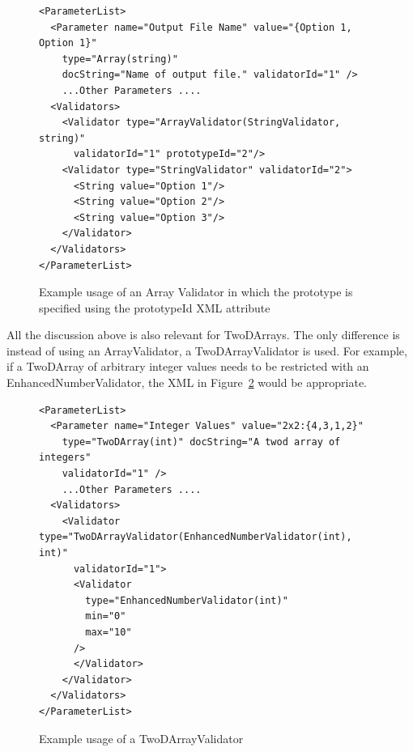 \begin{figure}
\centering
{\footnotesize
\begin{Verbatim}
<ParameterList>
  <Parameter name="Output File Name" value="{Option 1, Option 1}" 
    type="Array(string)" 
    docString="Name of output file." validatorId="1" />
    ...Other Parameters ....
  <Validators>
    <Validator type="ArrayValidator(StringValidator, string)" 
      validatorId="1" prototypeId="2"/>
    <Validator type="StringValidator" validatorId="2">
      <String value="Option 1"/>
      <String value="Option 2"/>
      <String value="Option 3"/>
    </Validator>
  </Validators>
</ParameterList>
\end{Verbatim}
}
\caption{Example usage of an Array Validator in which the prototype is specified using the prototypeId XML attribute}
\label{protoAttributeArrayXML}
\end{figure}

All the discussion above is also relevant for TwoDArrays. The only difference is instead of using an ArrayValidator, a TwoDArrayValidator is used. For
example, if a TwoDArray of arbitrary integer values needs to be restricted with an EnhancedNumberValidator, the XML in Figure~\ref{TwoDArrayValidator}
would be appropriate.
\begin{figure}
\centering
{\footnotesize
\begin{Verbatim}
<ParameterList>
  <Parameter name="Integer Values" value="2x2:{4,3,1,2}" 
    type="TwoDArray(int)" docString="A twod array of integers" 
    validatorId="1" />
    ...Other Parameters ....
  <Validators>
    <Validator type="TwoDArrayValidator(EnhancedNumberValidator(int), int)" 
      validatorId="1">
      <Validator 
        type="EnhancedNumberValidator(int)"
        min="0"
        max="10"
      />
      </Validator>
    </Validator>
  </Validators>
</ParameterList>
\end{Verbatim}
}
\caption{Example usage of a TwoDArrayValidator}
\label{TwoDArrayValidator}
\end{figure}


